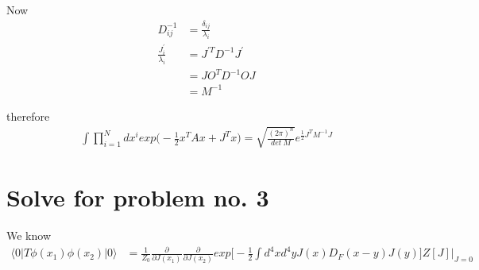 \documentclass[12pt, letterpaper]{article}
\newcommand*{\1}{\hspace{1pt}}
\begin{document}
Now 
\begin{align*}
    D^{-1} _{ij} &= \frac{\delta_{ij}}{\lambda_{i}} \\
    \frac{J^{\prime}_{i}}{\lambda_{i}} &= J^{\prime T} D^{-1} J^{\prime} \\ 
    &= J O^{T} D^{-1} O J \\
    &= M^{-1}
\end{align*}

therefore
\begin{align*}
    \int \prod ^{N} _{i=1} dx^{i} exp\bigg(-\frac{1}{2}x^{T}Ax + J^{T}x\bigg) = \sqrt{\frac{(2\pi)^{n}}{det \ M}} e^{\frac{1}{2}J^{T}M^{-1}J}
\end{align*}
\section*{Solve for problem no. 3}
We know
\begin{align*}
    \langle 0 | T\phi(x_{1})\phi(x_{2}) | 0 \rangle &= \frac{1}{Z_{0}}\frac{\partial}{\partial J(x_{1})}\frac{\partial}{\partial J(x_{2})} exp\bigg[-\frac{1}{2}\int d^{4}x d^{4}y J(x)D_{F}(x-y) J(y) \bigg] Z[J] \bigg|_{J=0} \\
\end{align*}
\end{document}
